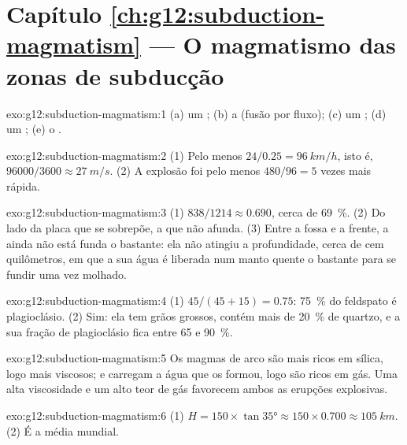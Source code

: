 \section*{Capítulo \ref{ch:g12:subduction-magmatism} --- O magmatismo das zonas de subducção}

\begin{solution}{exo:g12:subduction-magmatism:1}
(a) um ; (b) a  (fusão por fluxo); (c) um
; (d) um ; (e) o .
\end{solution}

\begin{solution}{exo:g12:subduction-magmatism:2}
(1) Pelo menos $24/0.25 = \qty{96}{km/h}$, isto é, $\num{96000}/3600 \approx
\qty{27}{m/s}$. (2) A explosão foi pelo menos $480/96 = 5$ vezes mais rápida.
\end{solution}

\begin{solution}{exo:g12:subduction-magmatism:3}
(1) $838/1214 \approx 0.690$, cerca de \qty{69}{\percent}. (2) Do lado da
placa que se sobrepõe, a que não afunda. (3) Entre a fossa e a frente, a 
ainda não está funda o bastante: ela não atingiu a profundidade, cerca de
cem quilômetros, em que a sua água é liberada num manto quente o bastante
para se fundir uma vez molhado.
\end{solution}

\begin{solution}{exo:g12:subduction-magmatism:4}
(1) $45/(45 + 15) = 0.75$: \qty{75}{\percent} do feldspato é plagioclásio.
(2) Sim: ela tem grãos grossos, contém mais de \qty{20}{\percent} de
quartzo, e a sua fração de plagioclásio fica entre 65 e \qty{90}{\percent}.
\end{solution}

\begin{solution}{exo:g12:subduction-magmatism:5}
Os magmas de arco são mais ricos em sílica, logo mais viscosos; e carregam a
água que os formou, logo são ricos em gás. Uma alta viscosidade e um alto
teor de gás favorecem ambos as erupções explosivas.
\end{solution}

\begin{solution}{exo:g12:subduction-magmatism:6}
(1) $H = 150 \times \tan\ang{35} \approx 150 \times 0.700 \approx
\qty{105}{km}$. (2) É a média mundial.
\end{solution}

